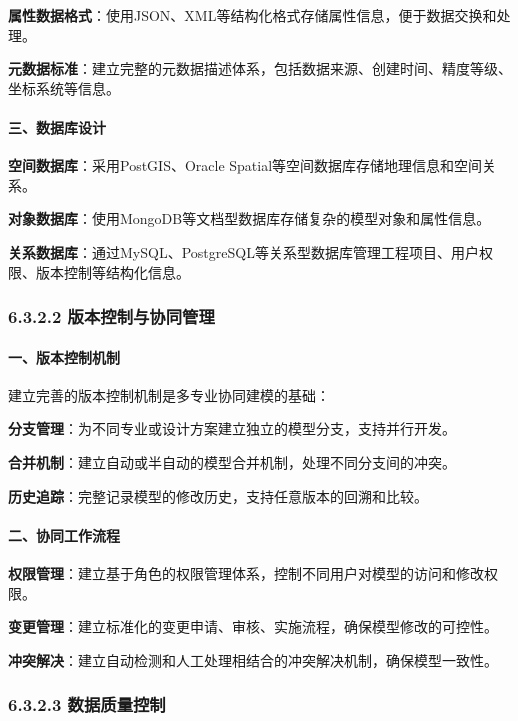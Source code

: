 \textbf{属性数据格式}：使用JSON、XML等结构化格式存储属性信息，便于数据交换和处理。

\textbf{元数据标准}：建立完整的元数据描述体系，包括数据来源、创建时间、精度等级、坐标系统等信息。

\paragraph{三、数据库设计}\label{ux4e09ux6570ux636eux5e93ux8bbeux8ba1}

\textbf{空间数据库}：采用PostGIS、Oracle
Spatial等空间数据库存储地理信息和空间关系。

\textbf{对象数据库}：使用MongoDB等文档型数据库存储复杂的模型对象和属性信息。

\textbf{关系数据库}：通过MySQL、PostgreSQL等关系型数据库管理工程项目、用户权限、版本控制等结构化信息。

\subsubsection{6.3.2.2
版本控制与协同管理}\label{ux7248ux672cux63a7ux5236ux4e0eux534fux540cux7ba1ux7406}

\paragraph{一、版本控制机制}\label{ux4e00ux7248ux672cux63a7ux5236ux673aux5236}

建立完善的版本控制机制是多专业协同建模的基础：

\textbf{分支管理}：为不同专业或设计方案建立独立的模型分支，支持并行开发。

\textbf{合并机制}：建立自动或半自动的模型合并机制，处理不同分支间的冲突。

\textbf{历史追踪}：完整记录模型的修改历史，支持任意版本的回溯和比较。

\paragraph{二、协同工作流程}\label{ux4e8cux534fux540cux5de5ux4f5cux6d41ux7a0b}

\textbf{权限管理}：建立基于角色的权限管理体系，控制不同用户对模型的访问和修改权限。

\textbf{变更管理}：建立标准化的变更申请、审核、实施流程，确保模型修改的可控性。

\textbf{冲突解决}：建立自动检测和人工处理相结合的冲突解决机制，确保模型一致性。

\subsubsection{6.3.2.3
数据质量控制}\label{ux6570ux636eux8d28ux91cfux63a7ux5236}

